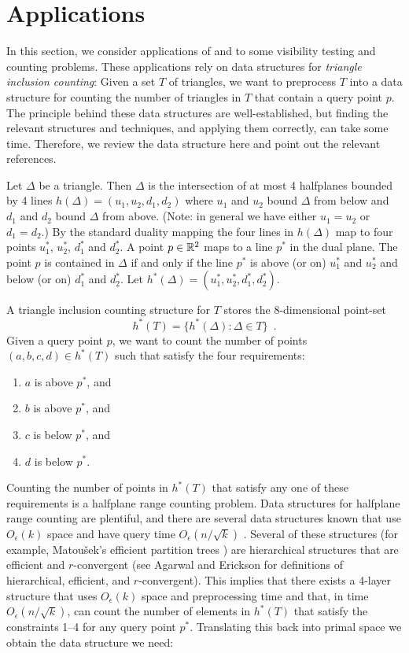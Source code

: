 \documentclass{patmorin}
\newcommand{\Oe}{O_\epsilon}
\begin{document}
\section{Applications}

In this section, we consider applications of  and
 to some visibility testing and counting problems. These
applications rely on data structures for \emph{triangle inclusion
counting}:  Given a set $T$ of triangles, we want to preprocess $T$
into a data structure for counting the number of triangles in $T$ that
contain a query point $p$.  The principle behind these data structures
are well-established, but finding the relevant structures and techniques,
and applying them correctly, can take some time.  Therefore, we review
the data structure here and point out the relevant references.

Let $\Delta$ be a triangle. Then $\Delta$ is the intersection of at most
4 halfplanes bounded by 4 lines $h(\Delta)=(u_1,u_2,d_1,d_2)$ where $u_1$
and $u_2$ bound $\Delta$ from below and $d_1$ and $d_2$ bound $\Delta$
from above.  (Note: in general we have either $u_1=u_2$ or $d_1=d_2$.)
By the standard duality mapping \cite[Section~8.2]{bcko08} the four lines
in $h(\Delta)$ map to four points $u_1^*$, $u_2^*$, $d_1^*$ and $d_2^*$.
A point $p\in\mathbb{R}^2$ maps to a line $p^*$ in the dual plane.  The point
$p$ is contained in $\Delta$ if and only if the line $p^*$ is above
(or on) $u_1^*$ and $u_2^*$ and below (or on) $d_1^*$ and $d_2^*$.
Let $h^*(\Delta)=(u_1^*,u_2^*,d_1^*,d_2^*)$.

A triangle inclusion counting structure for $T$ stores the 8-dimensional
point-set
\[
    h^*(T) = \{ h^*(\Delta) : \Delta\in T \} \enspace .
\]
Given a query point $p$, we want to count the number of points
$(a,b,c,d)\in h^*(T)$ such that satisfy the four requirements:
\begin{enumerate}
  \item $a$ is above $p^*$, and
  \item $b$ is above $p^*$, and 
  \item $c$ is below $p^*$, and
  \item $d$ is below $p^*$.
\end{enumerate}
Counting the number of points in $h^*(T)$ that satisfy any one of these
requirements is a halfplane range counting problem.  Data structures
for halfplane range counting are plentiful, and there are several
data structures known that use $\Oe(k)$ space and have query time
$\Oe(n/\sqrt{k})$ \cite[Section~4]{ae99}.  Several of these structures
(for example, Matou\v{s}ek's efficient partition trees \cite{m92}) are
hierarchical structures that are efficient and $r$-convergent (see Agarwal
and Erickson \cite[Section~5]{ae99} for definitions of hierarchical,
efficient, and $r$-convergent).  This implies \cite[Theorem~10]{ae99}
that there exists a 4-layer structure that uses $\Oe(k)$ space and
preprocessing time and that, in time $\Oe(n/\sqrt{k})$, can count the
number of elements in $h^*(T)$ that satisfy the constraints 1--4 for any
query point $p^*$.  Translating this back into primal space we obtain
the data structure we need:
\end{document}
